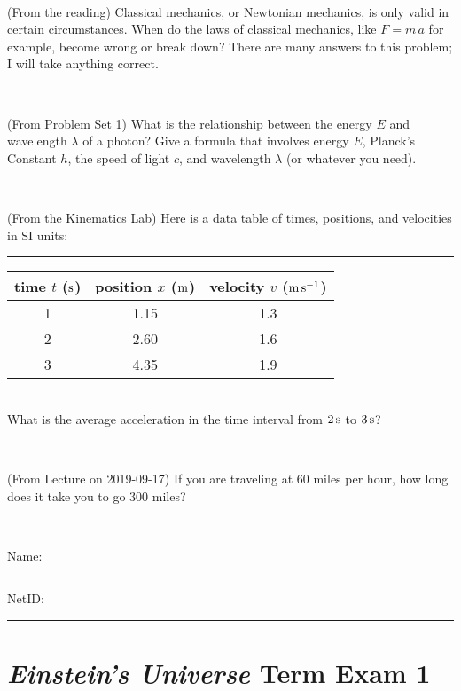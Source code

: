 \documentclass[12pt, letterpaper]{article}
\begin{document}
\vfill ~


\clearpage


\begin{problem} (From the reading)
Classical mechanics, or Newtonian mechanics, is only valid in certain
circumstances. When do the laws of classical mechanics, like $F =
m\,a$ for example, become wrong or break down? There are many answers
to this problem; I will take anything correct.
\end{problem}


\vfill ~

\begin{problem} (From Problem Set 1)
What is the relationship between the energy $E$ and wavelength
$\lambda$ of a photon? Give a formula that involves energy $E$,
Planck's Constant $h$, the speed of light $c$, and wavelength
$\lambda$ (or whatever you need).
\end{problem}

\vfill ~

\begin{problem} (From the Kinematics Lab)
Here is a data table of times, positions, and velocities in SI units:\\
\rule{1.0in}{0pt}\begin{tabular}{c|c|c}
time $t$ ($\mathrm{s}$) & position $x$ ($\mathrm{m}$) & velocity $v$ ($\mathrm{m}\,\mathrm{s}^{-1}$) \\
\hline
1 & 1.15 & 1.3 \\
2 & 2.60 & 1.6 \\
3 & 4.35 & 1.9 \\
\hline
\end{tabular}\\
What is the average acceleration in the time interval from $2\,\mathrm{s}$ to $3\,\mathrm{s}$?
\end{problem}


\vfill ~

\begin{problem} (From Lecture on 2019-09-17)
If you are traveling at 60 miles per hour, how long does
it take you to go 300 miles?
\end{problem}


\vfill ~


\cleardoublepage



\noindent
Name: \rule[-1ex]{0.60\textwidth}{0.1pt}
NetID: \rule[-1ex]{0.20\textwidth}{0.1pt}

\section*{\textsl{Einstein's Universe} Term Exam 1}
\setcounter{problem}{1}
\end{document}
